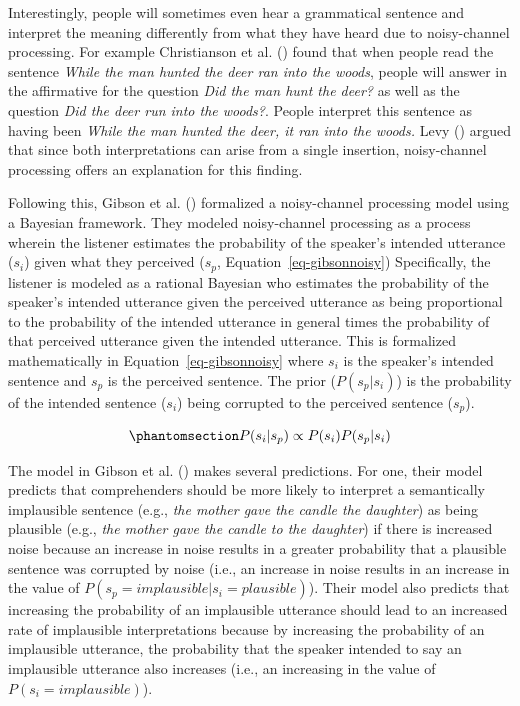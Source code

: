 \documentclass[
  12pt,
]{scrartcl}
\begin{document}
Interestingly, people will sometimes even hear a grammatical sentence
and interpret the meaning differently from what they have heard due to
noisy-channel processing. For example Christianson et al.
() found that
when people read the sentence \emph{While the man hunted the deer ran
into the woods}, people will answer in the affirmative for the question
\emph{Did the man hunt the deer?} as well as the question \emph{Did the
deer run into the woods?}. People interpret this sentence as having been
\emph{While the man hunted the deer, it ran into the woods.} Levy
() argued that since
both interpretations can arise from a single insertion, noisy-channel
processing offers an explanation for this finding.

Following this, Gibson et al.
()
formalized a noisy-channel processing model using a Bayesian framework.
They modeled noisy-channel processing as a process wherein the listener
estimates the probability of the speaker's intended utterance (\(s_i\))
given what they perceived (\(s_p\), Equation~\ref{eq-gibsonnoisy})
Specifically, the listener is modeled as a rational Bayesian who
estimates the probability of the speaker's intended utterance given the
perceived utterance as being proportional to the probability of the
intended utterance in general times the probability of that perceived
utterance given the intended utterance. This is formalized
mathematically in Equation~\ref{eq-gibsonnoisy} where \(s_i\) is the
speaker's intended sentence and \(s_p\) is the perceived sentence. The
prior (\(P(s_p|s_i)\)) is the probability of the intended sentence
(\(s_i\)) being corrupted to the perceived sentence (\(s_p\)).

\begin{equation}\phantomsection\label{eq-gibsonnoisy}{
P(s_i|s_p)\propto P(s_i) P(s_p|s_i) 
}\end{equation}

The model in Gibson et al.
()
makes several predictions. For one, their model predicts that
comprehenders should be more likely to interpret a semantically
implausible sentence (e.g., \emph{the mother gave the candle the
daughter}) as being plausible (e.g., \emph{the mother gave the candle to
the daughter}) if there is increased noise because an increase in noise
results in a greater probability that a plausible sentence was corrupted
by noise (i.e., an increase in noise results in an increase in the value
of \(P(s_p=implausible|s_i=plausible)\)). Their model also predicts that
increasing the probability of an implausible utterance should lead to an
increased rate of implausible interpretations because by increasing the
probability of an implausible utterance, the probability that the
speaker intended to say an implausible utterance also increases (i.e.,
an increasing in the value of \(P(s_i=implausible)\)).
\end{document}
